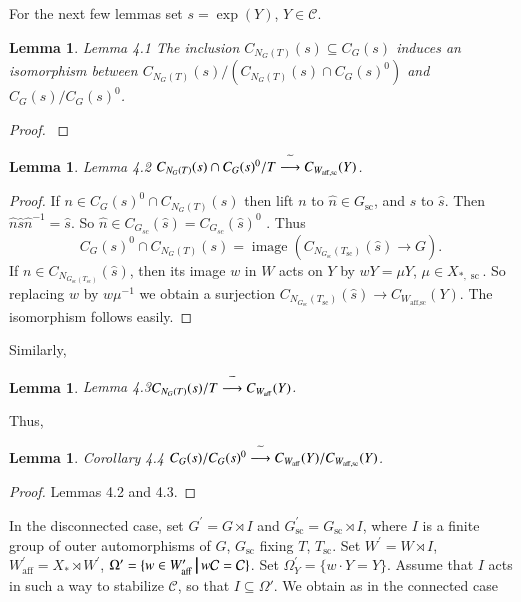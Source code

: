 \documentclass[11pt]{amsart}
\theoremstyle{plain}
\newtheorem{lemma}[theorem]{Lemma}
\theoremstyle{definition}
\def\suchthat{\ {\vrule width1truept height.3truecm depth.1truecm}\ }
\def\sc{\operatorname{sc}}
\def\Waff{W_{\operatorname{aff}}}
\def\Waffsc{W_{\operatorname{aff,sc}}}
\def\map{\buildrel{}\widetilde{}\over\longrightarrow}
\def\CurlyC{{\mathcal C}}
\def\CARTER{3}
\begin{document}
For the next few lemmas set $s=\exp(Y)$, $Y\in \CurlyC$.
\begin{lemma}{Lemma 4.1}    The inclusion $C_{N_G(T)}(s)\subseteq
C_G(s)$ induces an isomorphism between
$
C_{N_G(T)}(s)/(C_{N_G(T)}(s)\cap C_G(s)^0)$ and $C_G(s)/C_G(s)^0$.
\end{lemma}

\begin{proof} \cite{\CARTER}
\end{proof}

\begin{lemma}{Lemma 4.2} 
$
C_{N_G(T)}(s)\cap C_G(s)^0/T\map C_{\Waffsc}(Y)
$.
\end{lemma}

\begin{proof}  If $n\in C_G(s)^0\cap C_{N_G(T)}(s)$ then
lift $n$ to $\widehat n\in G_{\sc}$, and $s$ to $\widehat s$.  Then 
$\widehat n\widehat s\widehat n^{-1}=\widehat s$.  So
$\widehat n\in C_{G_{sc}}(\widehat s) = C_{G_{sc}}(\widehat s)^0$ \cite{\CARTER}.
Thus
$$
C_G(s)^0\cap C_{N_G(T)}(s) =
\operatorname{image}\left(
C_{N_{G_{\sc}}(T_{\sc})}
(\widehat s)\to G\right).
$$
If $n\in C_{N_{G_{\sc}(T_{\sc})}}(\widehat s)$,
then its image $w$ in $W$ acts on $Y$
by $wY =\mu Y$, $\mu\in X_{*,\sc}$.  So replacing
$w$ by $w\mu^{-1}$ we obtain a surjection
$C_{N_{G_{\sc}}(T_{\sc})}(\widehat s)\to C_{\Waffsc}(Y)$.
The isomorphism follows easily.
\end{proof}
Similarly,
\begin{lemma}{Lemma 4.3}$C_{N_G(T)}(s)/T\map C_{\Waff}(Y)$.
\end{lemma}

Thus,
\begin{lemma}{Corollary 4.4} $C_G(s)/C_G(s)^0\map
C_{\Waff}(Y)/C_{\Waffsc}(Y)$.
\end{lemma}

\begin{proof}  Lemmas 4.2 and 4.3.
\end{proof}

In the disconnected case, set 
$G^\prime = G\rtimes I$ and 
$G_{\sc}^\prime=G_{\sc}\rtimes I$,
where $I$ is a finite group of outer automorphisms
of $G$, $G_{\sc}$ fixing $T$, $T_{\sc}$.  Set
$W^\prime = W\rtimes I$, 
$W_{\operatorname{aff}}^\prime = X_*\rtimes W^\prime$,
$\Omega^\prime = \{w\in W_{\operatorname{aff}}^\prime
\suchthat w\CurlyC = \CurlyC\}$.  Set $\Omega^\prime_Y = \{w\cdot Y=Y\}$.
Assume that $I$ acts in such a way to stabilize $\CurlyC$, so that $I\subseteq\Omega'$. We obtain as in the 
connected case
\end{document}
